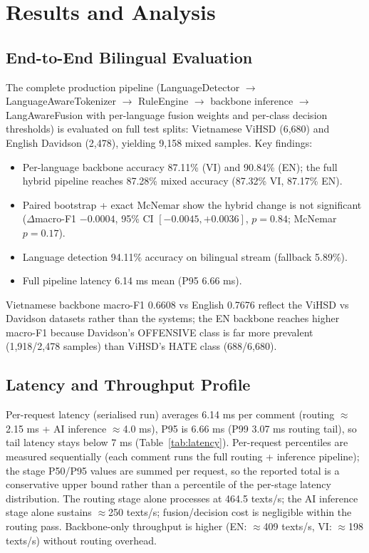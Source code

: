 \section{Results and Analysis}
\label{sec:results}

\subsection{End-to-End Bilingual Evaluation}
\label{sec:e2e}

The complete production pipeline (LanguageDetector $\to$ LanguageAwareTokenizer $\to$
RuleEngine $\to$ backbone inference $\to$ LangAwareFusion with per-language fusion
weights and per-class decision thresholds) is evaluated
on full test splits: Vietnamese ViHSD (6,680) and English Davidson (2,478), yielding
9,158 mixed samples.  Key findings:

\begin{itemize}
    \item Per-language backbone accuracy 87.11\% (VI) and 90.84\% (EN); the
          full hybrid pipeline reaches 87.28\% mixed accuracy (87.32\% VI, 87.17\% EN).
    \item Paired bootstrap + exact McNemar show the hybrid change is not
          significant ($\Delta$macro-F1 $-0.0004$, 95\% CI $[-0.0045,+0.0036]$, $p=0.84$;
          McNemar $p=0.17$).
    \item Language detection 94.11\% accuracy on bilingual stream (fallback 5.89\%).
    \item Full pipeline latency 6.14 ms mean (P95 6.66 ms).
\end{itemize}

Vietnamese backbone macro-F1 0.6608 vs English 0.7676 reflect the ViHSD vs
Davidson datasets rather than the systems; the EN backbone reaches higher
macro-F1 because Davidson's OFFENSIVE class is far more prevalent (1,918/2,478
samples) than ViHSD's HATE class (688/6,680).




\subsection{Latency and Throughput Profile}
\label{sec:latency}

Per-request latency (serialised run) averages 6.14 ms per comment (routing $\approx$2.15 ms + AI inference $\approx$4.0 ms),
P95 is 6.66 ms (P99 3.07 ms routing tail), so tail latency stays below 7 ms (Table~\ref{tab:latency}).
Per-request percentiles are measured sequentially (each comment runs the full
routing + inference pipeline); the stage P50/P95 values are summed per request,
so the reported total is a conservative upper bound rather than a percentile
of the per-stage latency distribution.
The routing stage alone processes at 464.5 texts/s; the AI inference stage alone
sustains $\approx$250 texts/s; fusion/decision cost is negligible within the routing pass.
Backbone-only throughput is higher (EN: $\approx$409 texts/s, VI: $\approx$198 texts/s) without routing overhead.

